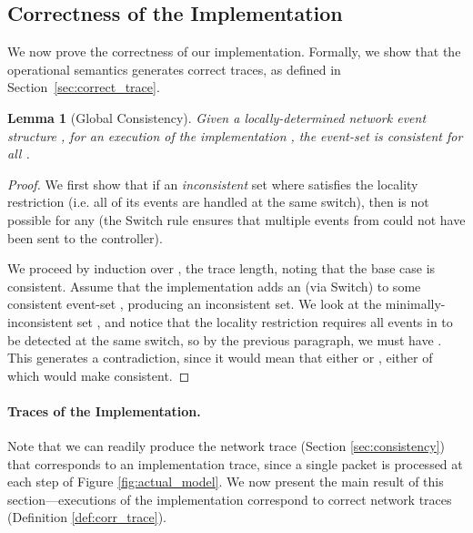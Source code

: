 \documentclass[pldi-cameraready]{sigplanconf}
\newtheorem{lemma}{Lemma}
\begin{document}
\subsection{Correctness of the Implementation}
\label{sec:correctness}

We now prove the correctness of our implementation. Formally, we show
that the operational semantics generates correct traces, as defined in Section~\ref{sec:correct_trace}.


\renewcommand*{\proofname}{Proof Sketch}

\begin{lemma}[Global Consistency]
\label{lem:consistent}
Given a locally-determined network event structure , for an execution of the implementation
, the event-set
 is 
consistent for all .
\end{lemma}
\begin{proof}


We first show that if an {\em inconsistent} set  where 
satisfies the locality restriction (i.e. all of its events are
handled at the same switch), then  is
not possible for any  (the {\sc Switch} rule ensures that multiple events from  could not have been 
sent to the controller).

We proceed by induction over , the trace length,
noting that the base case  is consistent.
Assume that the implementation
adds an  (via {\sc Switch}) to some consistent event-set , producing an inconsistent set. We look
at the minimally-inconsistent set , and notice that the
locality restriction requires all events in  to be detected at the same switch,
so by the previous paragraph, we must have .
This generates a contradiction, since it would mean that either 
or , either of which would make  consistent.
\end{proof}



\paragraph{Traces of the Implementation.}
Note that we can readily produce the network trace (Section \ref{sec:consistency})
that corresponds to an implementation trace, since a single packet  is processed at each step of
Figure \ref{fig:actual_model}.
We now present the main result of this
section---executions of the implementation correspond to correct network
  traces (Definition \ref{def:corr_trace}).
\end{document}
